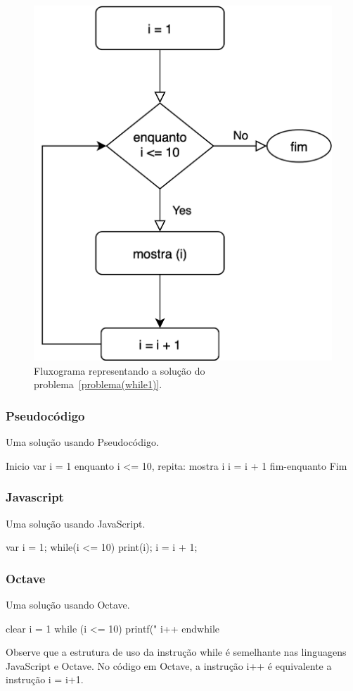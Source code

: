 \begin{figure}[h]
  \begin{center}
    \includegraphics[width=0.5\linewidth]{img/problemaWhile1.png}
    \caption{Fluxograma representando a solução do problema~\ref{problema(while1)}.}
    \label{fig:problema1}
  \end{center}
\end{figure}

\subsubsection{Pseudocódigo}
Uma solução usando Pseudocódigo.
\begin{pseudocode}
Inicio
var i = 1
enquanto i <= 10, repita:
  mostra i
  i = i + 1
fim-enquanto
Fim 
\end{pseudocode}

\subsubsection{Javascript}
Uma solução usando JavaScript.
\begin{code}
var i = 1;
while(i <= 10){
  print(i);
  i = i + 1;
} 
\end{code}

\subsubsection{Octave}
Uma solução usando Octave. 
\begin{code}
clear
i = 1
while (i <= 10)
  printf(" %
  i++
endwhile
\end{code}

Observe que a estrutura de uso da instrução while é semelhante nas linguagens JavaScript e Octave. No código em Octave, a instrução i++ é equivalente a instrução i = i+1.

